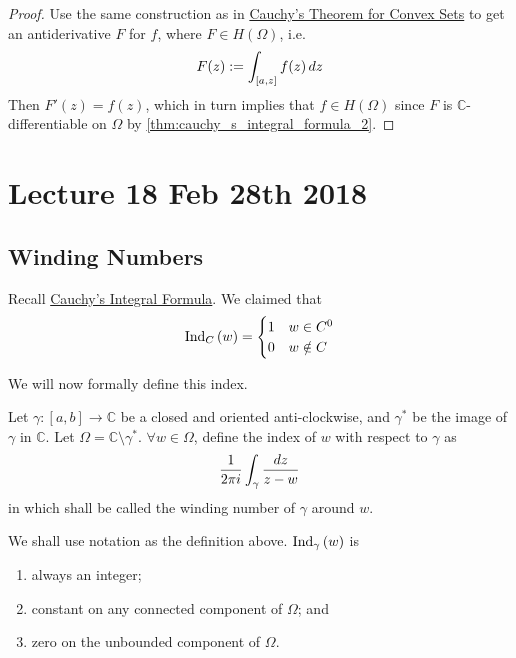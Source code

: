 \documentclass[11pt, oneside]{book}
\begin{document}
\begin{proof}
	Use the same construction as in \hyperref[thm:cauchy_s_theorem_for_convex_set]{Cauchy's Theorem for Convex Sets} to get an antiderivative $F$ for $f$, where $F \in H(\Omega)$, i.e.
	\begin{equation*}
		F(z) := \int_{[a, z]} f(z) \dif{z}
	\end{equation*}
	Then $F'(z) = f(z)$, which in turn implies that $f \in H(\Omega)$ since $F$ is $\mathbb{C}$-differentiable on $\Omega$ by \cref{thm:cauchy_s_integral_formula_2}.
\end{proof}



\chapter{Lecture 18 Feb 28th 2018}
	\label{chapter:lecture_18_feb_28th_2018}

\section{Winding Numbers} %
\label{sec:winding_numbers}

Recall \hyperref[thm:cauchy_s_integral_formula_1]{Cauchy's Integral Formula}. We claimed that
\begin{equation*}
	\ind{w}{C} = \begin{cases}
		1	& w \in C^0 \\
		0	& w \notin C
	\end{cases}
\end{equation*}

We will now formally define this index.

\begin{defn}\label{defn:winding_numbers}
	Let $\gamma : [a, b] \to \mathbb{C}$ be a closed and oriented anti-clockwise, and $\gamma^*$ be the image of $\gamma$ in $\mathbb{C}$. Let $\Omega = \mathbb{C} \setminus \gamma^*$. $\forall w \in \Omega$, define the index of $w$ with respect to $\gamma$ as
	\begin{equation*}
		\frac{1}{2 \pi i} \int_{\gamma} \frac{\dif{z}}{z - w} 
	\end{equation*}
	in which shall be called the winding number of $\gamma$ around $w$.
\end{defn}

\begin{thm}\label{thm:winding_number_theorem}
	We shall use notation as the definition above. $\ind{w}{\gamma}$ is
	\begin{enumerate}
		\item always an integer;
		\item constant on any connected component of $\Omega$; and
		\item zero on the unbounded component of $\Omega$.
	\end{enumerate}
\end{thm}
\end{document}
